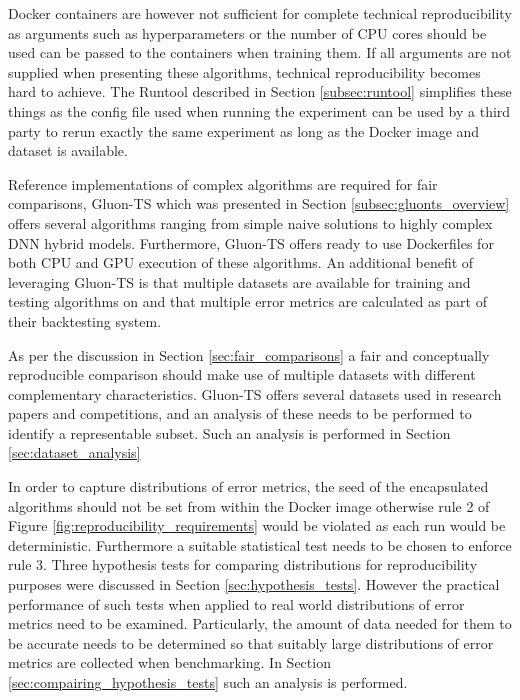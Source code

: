 Docker containers are however not sufficient for complete technical reproducibility as arguments such as hyperparameters or the number of CPU cores should be used can be passed to the containers when training them. If all arguments are not supplied when presenting these algorithms, technical reproducibility becomes hard to achieve. The Runtool described in Section \ref{subsec:runtool} simplifies these things as the config file used when running the experiment can be used by a third party to rerun exactly the same experiment as long as the Docker image and dataset is available.

Reference implementations of complex algorithms are required for fair comparisons, Gluon-TS which was presented in Section \ref{subsec:gluonts_overview} offers several algorithms ranging from simple naive solutions to highly complex DNN hybrid models. Furthermore, Gluon-TS offers ready to use Dockerfiles for both CPU and GPU execution of these algorithms. An additional benefit of leveraging Gluon-TS is that multiple datasets are available for training and testing algorithms on and that multiple error metrics are calculated as part of their backtesting system.

As per the discussion in Section \ref{sec:fair_comparisons} a fair and conceptually reproducible comparison should make use of multiple datasets with different complementary characteristics. Gluon-TS offers several datasets used in research papers and competitions, and an analysis of these needs to be performed to identify a representable subset. Such an analysis is performed in Section \ref{sec:dataset_analysis}

In order to capture distributions of error metrics, the seed of the encapsulated algorithms should not be set from within the Docker image otherwise rule 2 of Figure \ref{fig:reproducibility_requirements} would be violated as each run would be deterministic. Furthermore a suitable statistical test needs to be chosen to enforce rule 3. Three hypothesis tests for comparing distributions for reproducibility purposes were discussed in Section \ref{sec:hypothesis_tests}. However the practical performance of such tests when applied to real world distributions of error metrics need to be examined. Particularly, the amount of data needed for them to be accurate needs to be determined so that suitably large distributions of error metrics are collected when benchmarking. In Section \ref{sec:compairing_hypothesis_tests} such an analysis is performed.

